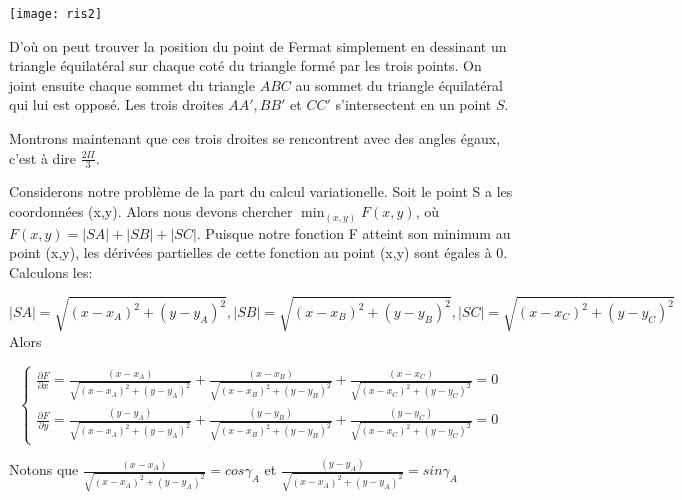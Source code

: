 \documentclass[11pt,a4paper]{report}%
\begin{document}
		\texttt{[image: ris2]}
        
        D'où on peut trouver la position du point de Fermat simplement en dessinant un triangle équilatéral sur chaque coté du triangle formé par les trois points. On joint ensuite chaque sommet du triangle $ABC$ au sommet du triangle équilatéral qui lui est opposé. Les trois droites $AA',BB'$ et $CC'$ s'intersectent en un point $S$.
        
        Montrons maintenant que ces trois droites se rencontrent avec des angles égaux, c'est à dire $\frac{2\Pi}{3}$. 
        
        Considerons notre problème de la part du calcul variationelle. Soit le point S a les coordonnées (x,y). Alors nous devons chercher $\min_{(x,y)} F(x,y)$, où $F(x,y)=|SA|+|SB|+|SC|$. Puisque notre fonction F atteint son minimum au point (x,y), les dérivées partielles de cette fonction au point (x,y) sont égales à 0. Calculons les:
        
        \[|SA|=\sqrt{(x-x_A)^2+(y-y_A)^2}, |SB|=\sqrt{(x-x_B)^2+(y-y_B)^2}, |SC|=\sqrt{(x-x_C)^2+(y-y_C)^2}\]
        Alors
        
        \begin{equation*}
        \begin{cases}
        \frac{\partial F}{\partial x}=\frac{(x-x_A)}{\sqrt{(x-x_A)^2+(y-y_A)^2}}+\frac{(x-x_B)}{\sqrt{(x-x_B)^2+(y-y_B)^2}}+\frac{(x-x_C)}{\sqrt{(x-x_C)^2+(y-y_C)^2}}=0
        \\
        \frac{\partial F}{\partial y}=\frac{(y-y_A)}{\sqrt{(x-x_A)^2+(y-y_A)^2}}+\frac{(y-y_B)}{\sqrt{(x-x_B)^2+(y-y_B)^2}}+\frac{(y-y_C)}{\sqrt{(x-x_C)^2+(y-y_C)^2}}=0
        \end{cases}
        \end{equation*}
        
        Notons que $\frac{(x-x_A)}{\sqrt{(x-x_A)^2+(y-y_A)^2}}=cos\gamma_A$ et $\frac{(y-y_A)}{\sqrt{(x-x_A)^2+(y-y_A)^2}}=sin \gamma_A$
        
        
\end{document}
